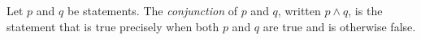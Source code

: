 \guard





\begin{defn}
\label{defn:conjunctionOfStatement}
  Let $p$ and $q$ be statements.
  The \emph{conjunction} of $p$ and $q$, written $p \wedge q$, is the statement that is true precisely when both $p$ and $q$ are true and is otherwise false.
\end{defn}
